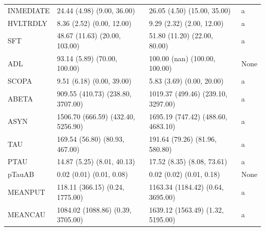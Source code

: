 \documentclass[1pt]{article}
\begin{document}
\begin{tabular}{llll}
	INMEDIATE &         24.44 (4.98) (9.00, 36.00) &        26.05 (4.50) (15.00, 35.00) &        a \\
	HVLTRDLY &          8.36 (2.52) (0.00, 12.00) &          9.29 (2.32) (2.00, 12.00) &        a \\
	SFT &      48.67 (11.63) (20.00, 103.00) &       51.80 (11.20) (22.00, 80.00) &        a \\
	ADL &       93.14 (5.89) (70.00, 100.00) &      100.00 (nan) (100.00, 100.00) &     None \\
	SCOPA &          9.51 (6.18) (0.00, 39.00) &          5.83 (3.69) (0.00, 20.00) &        a \\
	ABETA &  909.55 (410.73) (238.80, 3707.00) & 1019.37 (499.46) (239.10, 3297.00) &        a \\
	ASYN & 1506.70 (666.59) (432.40, 5256.90) & 1695.19 (747.42) (488.60, 4683.10) &        a \\
	TAU &     169.54 (56.80) (80.93, 467.00) &     191.64 (79.26) (81.96, 580.80) &        a \\
	PTAU &         14.87 (5.25) (8.01, 40.13) &         17.52 (8.35) (8.08, 73.61) &        a \\
	pTauAB &           0.02 (0.01) (0.01, 0.08) &           0.02 (0.02) (0.01, 0.18) &     None \\
	MEANPUT &    118.11 (366.15) (0.24, 1775.00) &  1163.34 (1184.42) (0.64, 3695.00) &        a \\
	MEANCAU &  1084.02 (1088.86) (0.39, 3705.00) &  1639.12 (1563.49) (1.32, 5195.00) &        a \\
	\bottomrule
\end{tabular}
\end{document}
